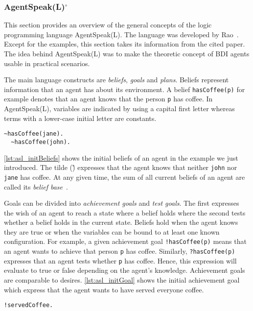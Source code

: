 \subsubsection[AgentSpeak(L)]{AgentSpeak(L)$^\circ$}\label{fun:apl_asl}
This section provides an overview of the general concepts of the logic programming language AgentSpeak(L).
The language was developed by Rao~\cite{rao_agentspeak_1996}.
Except for the examples, this section takes its information from the cited paper.
The idea behind AgentSpeak(L) was to make the theoretic concept of BDI agents usable in practical scenarios. %

The main language constructs are \emph{beliefs}, \emph{goals} and \emph{plans}.
Beliefs represent information that an agent has about its environment.
A belief \texttt{hasCoffee(p)} for example denotes that an agent knows that the person \texttt{p} has coffee.
In AgentSpeak(L), variables are indicated by using a capital first letter whereas terms with a lower-case initial letter are constants. %
\begin{lstlisting}[caption={Initial beliefs.}, label=lst:asl_initBeliefs]
  ~hasCoffee(jane).
  ~hasCoffee(john).
\end{lstlisting}
\autoref{lst:asl_initBeliefs} shows the initial beliefs of an agent in the example we just introduced.
The tilde (\~) expresses that the agent knows that neither \texttt{john} nor \texttt{jane} has coffee.
At any given time, the sum of all current beliefs of an agent are called its \emph{belief base}~\cite{bordini_jason_2005}. %

Goals can be divided into \emph{achievement goals} and \emph{test goals}.
The first expresses the wish of an agent to reach a state where a belief holds where the second tests whether a belief holds in the current state.
Beliefs hold when the agent knows they are true or when the variables can be bound to at least one known configuration.
For example, a given achievement goal \texttt{!hasCoffee(p)} means that an agent wants to achieve that person \texttt{p} has coffee.
Similarly, \texttt{?hasCoffee(p)} expresses that an agent tests whether \texttt{p} has coffee.
Hence, this expression will evaluate to true or false depending on the agent's knowledge.
Achievement goals are comparable to desires. %
\autoref{lst:asl_initGoal} shows the initial achievement goal which express that the agent wants to have served everyone coffee.
\begin{lstlisting}[firstnumber=3, caption={Initial goal.}, label=lst:asl_initGoal]
  !servedCoffee.
\end{lstlisting}

